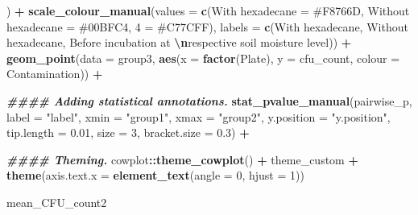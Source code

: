 \documentclass[
]{article}
\newenvironment{Shaded}{\begin{snugshade}}{\end{snugshade}}
\newcommand{\AttributeTok}[1]{\textcolor[rgb]{0.13,0.29,0.53}{#1}}
\newcommand{\DecValTok}[1]{\textcolor[rgb]{0.00,0.00,0.81}{#1}}
\newcommand{\DocumentationTok}[1]{\textcolor[rgb]{0.56,0.35,0.01}{\textbf{\textit{#1}}}}
\newcommand{\FloatTok}[1]{\textcolor[rgb]{0.00,0.00,0.81}{#1}}
\newcommand{\FunctionTok}[1]{\textcolor[rgb]{0.13,0.29,0.53}{\textbf{#1}}}
\newcommand{\NormalTok}[1]{#1}
\newcommand{\OtherTok}[1]{\textcolor[rgb]{0.56,0.35,0.01}{#1}}
\newcommand{\SpecialCharTok}[1]{\textcolor[rgb]{0.81,0.36,0.00}{\textbf{#1}}}
\newcommand{\StringTok}[1]{\textcolor[rgb]{0.31,0.60,0.02}{#1}}
\begin{document}
\begin{Shaded}
\begin{Highlighting}[]
\NormalTok{  ) }\SpecialCharTok{+}
  \FunctionTok{scale\_colour\_manual}\NormalTok{(}\AttributeTok{values =} \FunctionTok{c}\NormalTok{(}\StringTok{\textquotesingle{}With hexadecane\textquotesingle{}} \OtherTok{=} \StringTok{\textquotesingle{}\#F8766D\textquotesingle{}}\NormalTok{, }\StringTok{\textquotesingle{}Without hexadecane\textquotesingle{}} \OtherTok{=} \StringTok{\textquotesingle{}\#00BFC4\textquotesingle{}}\NormalTok{, }\StringTok{\textquotesingle{}4\textquotesingle{}} \OtherTok{=} \StringTok{\textquotesingle{}\#C77CFF\textquotesingle{}}\NormalTok{),}
                      \AttributeTok{labels =} \FunctionTok{c}\NormalTok{(}\StringTok{\textquotesingle{}With hexadecane\textquotesingle{}}\NormalTok{, }\StringTok{\textquotesingle{}Without hexadecane\textquotesingle{}}\NormalTok{, }
                                 \StringTok{\textquotesingle{}Before incubation at }\SpecialCharTok{\textbackslash{}n}\StringTok{respective soil moisture level\textquotesingle{}}\NormalTok{)) }\SpecialCharTok{+}
  \FunctionTok{geom\_point}\NormalTok{(}\AttributeTok{data =}\NormalTok{ group3,}
             \FunctionTok{aes}\NormalTok{(}\AttributeTok{x =} \FunctionTok{factor}\NormalTok{(Plate), }
                 \AttributeTok{y =}\NormalTok{ cfu\_count, }
                 \AttributeTok{colour =}\NormalTok{ Contamination)) }\SpecialCharTok{+}
  
  \DocumentationTok{\#\#\#\# Adding statistical annotations.}
  \FunctionTok{stat\_pvalue\_manual}\NormalTok{(pairwise\_p, }
                     \AttributeTok{label =} \StringTok{"label"}\NormalTok{, }
                     \AttributeTok{xmin =} \StringTok{"group1"}\NormalTok{, }\AttributeTok{xmax =} \StringTok{"group2"}\NormalTok{, }
                     \AttributeTok{y.position =} \StringTok{"y.position"}\NormalTok{, }
                     \AttributeTok{tip.length =} \FloatTok{0.01}\NormalTok{,}
                     \AttributeTok{size =} \DecValTok{3}\NormalTok{,}
                     \AttributeTok{bracket.size =} \FloatTok{0.3}\NormalTok{) }\SpecialCharTok{+}
  
  \DocumentationTok{\#\#\#\# Theming.}
\NormalTok{  cowplot}\SpecialCharTok{::}\FunctionTok{theme\_cowplot}\NormalTok{() }\SpecialCharTok{+}
\NormalTok{  theme\_custom }\SpecialCharTok{+}
\FunctionTok{theme}\NormalTok{(}\AttributeTok{axis.text.x =} \FunctionTok{element\_text}\NormalTok{(}\AttributeTok{angle =} \DecValTok{0}\NormalTok{, }\AttributeTok{hjust =} \DecValTok{1}\NormalTok{))}

\NormalTok{mean\_CFU\_count2}
\end{Highlighting}
\end{Shaded}
\end{document}

